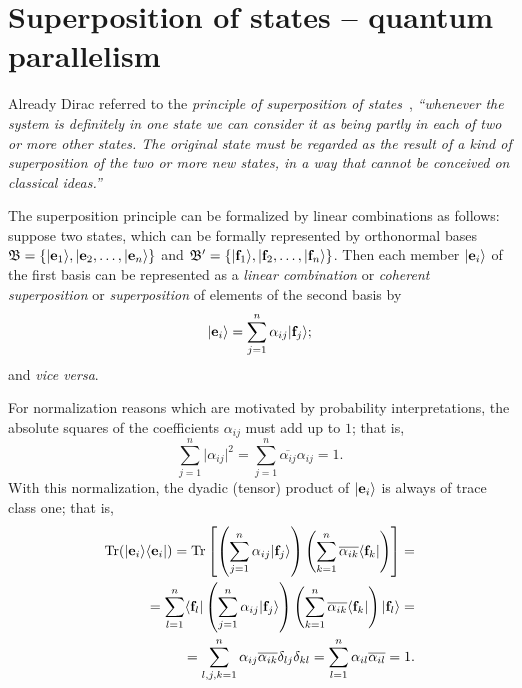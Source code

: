 \section{Superposition of states -- quantum parallelism}

Already Dirac referred to the {\em principle of superposition of states}~\cite[p.~11,12]{dirac},
{\em ``whenever the
system is definitely in one state we can consider it as being partly
in each of two or more other states.
The original state must be
regarded as the result of a kind of {\em superposition} of the two or more
new states, in a way that cannot be conceived on classical ideas.''}

The superposition principle can be formalized by linear combinations as follows: suppose two states, which can be formally represented by orthonormal bases
$\mathfrak{B}=\left\{ \vert {\bf e}_1 \rangle , \vert {\bf e}_2 , \ldots , \vert {\bf e}_n \rangle \right\}$
and
$\mathfrak{B}'=\left\{ \vert {\bf f}_1 \rangle , \vert {\bf f}_2 , \ldots , \vert {\bf f}_n \rangle \right\}$.
Then each member $ \vert {\bf e}_i \rangle$ of the first basis
can be represented as a
{\em linear combination}
or
{\em coherent superposition}
or
{\em superposition}  of elements of the second basis by
\begin{equation}
\vert {\bf e}_i \rangle =
\sum_{j=1}^n  \alpha_{ij} \vert {\bf f}_j \rangle
;
\end{equation}
and {\em vice versa}.


For normalization reasons which are motivated by probability interpretations, the absolute squares of the coefficients
$\alpha_{ij}$ must add up to $1$; that is,
\begin{equation}
\sum_{j=1}^n  \vert \alpha_{ij} \vert ^2  =
\sum_{j=1}^n  \overline{\alpha_{ij}} \alpha_{ij}   = 1
.
\end{equation}
With this normalization, the dyadic (tensor) product of $\vert {\bf e}_i \rangle$ is always of trace class one; that is,
\begin{equation}
\begin{split}
\textrm{Tr}(\vert {\bf e}_i \rangle  \langle   {\bf e}_i    \vert) =
\textrm{Tr}\left[
\left(\sum_{j=1}^n  \alpha_{ij} \vert {\bf f}_j \rangle \right)
\left(\sum_{k=1}^n  \overline{\alpha_{ik}}  \langle {\bf f}_k \vert \right)
\right]   =\\
=
\sum_{l=1}^n  \langle {\bf f}_l \vert
\left(\sum_{j=1}^n  \alpha_{ij} \vert {\bf f}_j \rangle \right)
\left(\sum_{k=1}^n  \overline{\alpha_{ik}} \langle {\bf f}_k \vert \right)
\vert {\bf f}_l \rangle   =\\
=
\sum_{l,j,k=1}^n  \alpha_{ij} \overline{\alpha_{ik}}  \delta_{lj}  \delta_{kl} =
\sum_{l=1}^n  \alpha_{il} \overline{\alpha_{il}}  =1
.
\end{split}
\end{equation}


